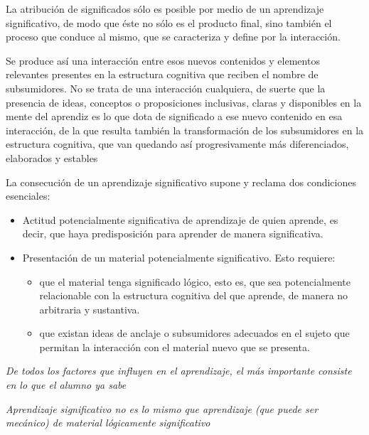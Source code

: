 \documentclass[12pt]{report}
\newcounter{it}
\theoremstyle{largebreak}
\begin{document}
    La atribución de significados sólo es posible
    por medio de un aprendizaje significativo, de modo que éste no sólo es el producto
    final, sino también el proceso que conduce al mismo, que se caracteriza y define por la
    interacción.

    Se produce así una interacción entre esos nuevos
    contenidos y elementos relevantes presentes en la estructura cognitiva que reciben el
    nombre de subsumidores. No se trata de una interacción cualquiera, de suerte que la
    presencia de ideas, conceptos o proposiciones inclusivas, claras y disponibles en la
    mente del aprendiz es lo que dota de significado a ese nuevo contenido en esa
    interacción, de la que resulta también la transformación de los subsumidores en la
    estructura cognitiva, que van quedando así progresivamente más diferenciados,
    elaborados y estables

    La consecución de un aprendizaje
    significativo supone y reclama dos condiciones esenciales: 
    \begin{itemize}
        \item Actitud potencialmente significativa de aprendizaje de quien aprende, es decir, que haya predisposición para aprender de manera significativa.
        \item Presentación de un material potencialmente significativo. Esto requiere:
        \begin{itemize}
            \item que el material tenga significado lógico, esto es, que sea potencialmente relacionable con la estructura cognitiva del que aprende, de manera no arbitraria y sustantiva.
            \item que existan ideas de anclaje o subsumidores adecuados en el sujeto que permitan la interacción con el material nuevo que se presenta.
        \end{itemize}
    \end{itemize}

    \begin{center}
        \textit{De todos los factores que influyen en el aprendizaje, el más importante consiste en lo que el alumno ya sabe}
    \end{center}

    \begin{center}
        \textit{Aprendizaje significativo no es lo mismo que aprendizaje (que puede ser mecánico) de material lógicamente significativo}
    \end{center}
\end{document}
